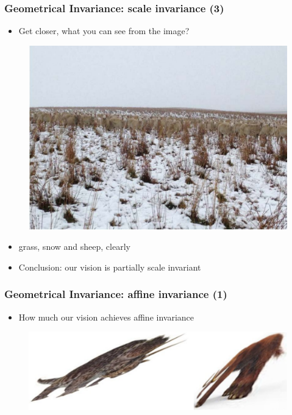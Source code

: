 \begin{frame}
\frametitle {Geometrical Invariance: scale invariance (3)}
\begin{itemize}
	\item {Get closer, what you can see from the image?}
\end{itemize}
\begin{figure}
	{\includegraphics[width=0.65\linewidth]{./figs/scale_sheep3.pdf}}
\end{figure}
\begin{itemize}
	\item {grass, snow and sheep, clearly}
	\item {Conclusion: our vision is partially scale invariant}
\end{itemize}
\end{frame}

\begin{frame}

\frametitle {Geometrical Invariance: affine invariance (1)}
\begin{itemize}
	\item {How much our vision achieves affine invariance}
\end{itemize}
\begin{figure}
	{\includegraphics[width=0.75\linewidth]{./figs/invariance_affine1.pdf}}
\end{figure}
\end{frame}

